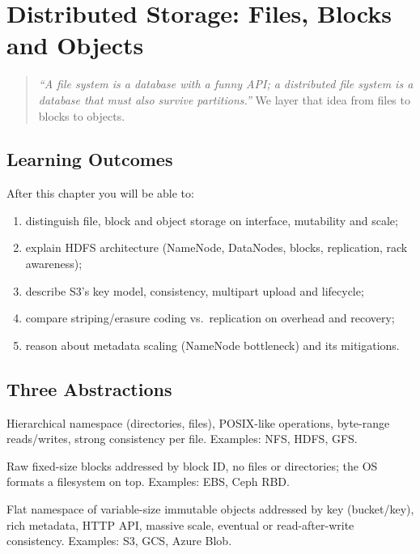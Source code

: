 \chapter{Distributed Storage: Files, Blocks and Objects}
\label{ch:storage}

\begin{quote}
\emph{``A file system is a database with a funny API; a distributed file system is a database that must also survive partitions.''} We layer that idea from files to blocks to objects.
\end{quote}

\noindent{}
\vspace{0.4em}

\section*{Learning Outcomes}
After this chapter you will be able to:
\begin{enumerate}[label=(L\arabic*)]
    \item distinguish file, block and object storage on interface, mutability and scale;
    \item explain HDFS architecture (NameNode, DataNodes, blocks, replication, rack awareness);
    \item describe S3's key model, consistency, multipart upload and lifecycle;
    \item compare striping/erasure coding vs.\ replication on overhead and recovery;
    \item reason about metadata scaling (NameNode bottleneck) and its mitigations.
\end{enumerate}

\section{Three Abstractions}
\label{sec:abstractions}
\begin{description}[leftmargin=1.2em,style=nextline]
    \item[File storage] Hierarchical namespace (directories, files), POSIX-like operations, byte-range reads/writes, strong consistency per file. Examples: NFS, HDFS, GFS.
    \item[Block storage] Raw fixed-size blocks addressed by block ID, no files or directories; the OS formats a filesystem on top. Examples: EBS, Ceph RBD.
    \item[Object storage] Flat namespace of variable-size immutable objects addressed by key (bucket/key), rich metadata, HTTP API, massive scale, eventual or read-after-write consistency. Examples: S3, GCS, Azure Blob.
\end{description}


